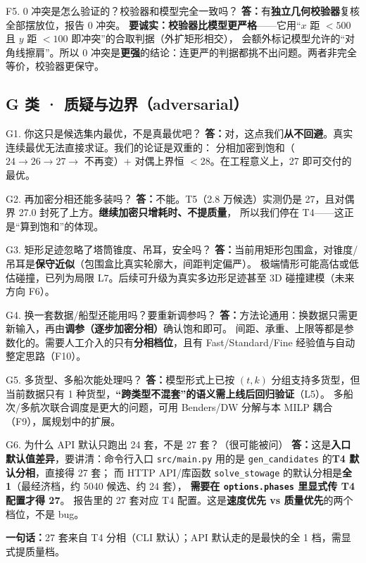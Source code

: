 \documentclass[11pt]{ctexart}
\newcommand{\code}[1]{\texttt{#1}}
\newcommand{\A}{\textbf{答：}}
\newcommand{\oneline}[1]{\begin{key}\textbf{一句话：}#1\end{key}}
\begin{document}
\begin{qa}{F5. 0 冲突是怎么验证的？校验器和模型完全一致吗？}
\A 有\textbf{独立几何校验器}复核全部摆放位，报告 0 冲突。
\textbf{要诚实：校验器比模型更严格}——它用“$x$ 距 $<500$ 且 $y$ 距 $<100$ 即冲突”的合取判据（外扩矩形相交），
会额外标记模型允许的“对角线擦肩”。所以 0 冲突是\textbf{更强}的结论：连更严的判据都挑不出问题。两者非完全等价，校验器更保守。
\end{qa}

\subsection{G 类 · 质疑与边界（adversarial）}

\begin{qa}{G1. 你这只是候选集内最优，不是真最优吧？}
\A 对，这点我们\textbf{从不回避}。真实连续最优无法直接求证。我们的论证是双重的：
分相加密到饱和（$24\to26\to27\to$ 不再变）+ 对偶上界恒 $<28$。在工程意义上，27 即可交付的最优。
\end{qa}

\begin{qa}{G2. 再加密分相还能多装吗？}
\A 不能。T5（2.8 万候选）实测仍是 27，且对偶界 27.0 封死了上方。\textbf{继续加密只增耗时、不提质量}，
所以我们停在 T4——这正是“算到饱和”的体现。
\end{qa}

\begin{qa}{G3. 矩形足迹忽略了塔筒锥度、吊耳，安全吗？}
\A 当前用矩形包围盒，对锥度/吊耳是\textbf{保守近似}（包围盒比真实轮廓大，间距判定偏严）。
极端情形可能高估或低估碰撞，已列为局限 L7。后续可升级为真实多边形足迹甚至 3D 碰撞建模（未来方向 F6）。
\end{qa}

\begin{qa}{G4. 换一套数据/船型还能用吗？要重新调参吗？}
\A 方法论通用：换数据只需更新输入，再由\textbf{调参（逐步加密分相）}确认饱和即可。
间距、承重、上限等都是参数化的。需要人工介入的只有\textbf{分相档位}，且有 Fast/Standard/Fine 经验值与自动整定思路（F10）。
\end{qa}

\begin{qa}{G5. 多货型、多船次能处理吗？}
\A 模型形式上已按 $(t,k)$ 分组支持多货型，但当前数据只有 1 种货型，\textbf{“跨类型不混套”的语义需上线后回归验证}（L5）。
多船次/多航次联合调度是更大的问题，可用 Benders/DW 分解与本 MILP 耦合（F9），属规划中的扩展。
\end{qa}

\begin{qa}{G6. 为什么 API 默认只跑出 24 套，不是 27 套？（很可能被问）}
\A 这是\textbf{入口默认值差异}，要讲清：命令行入口 \code{src/main.py} 用的是 \code{gen\_candidates} 的\textbf{T4 默认分相}，直接得 27 套；
而 HTTP API/库函数 \code{solve\_stowage} 的默认分相是\textbf{全 1}（最经济档，约 5040 候选、约 24 套），
\textbf{需要在 \code{options.phases} 里显式传 T4 配置才得 27}。
报告里的 27 套对应 T4 配置。这是\textbf{速度优先 vs 质量优先}的两个档位，不是 bug。
\oneline{27 套来自 T4 分相（CLI 默认）；API 默认走的是最快的全 1 档，需显式提质量档。}
\end{qa}
\end{document}
